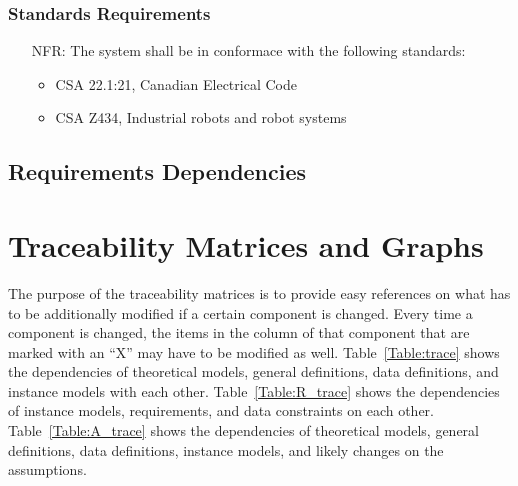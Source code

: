 \documentclass[12pt]{article}
\newcounter{nfrnum} %
\begin{document}
\subsubsection{Standards Requirements}
\noindent \begin{itemize}
\item[NFR\refstepcounter{nfrnum}\thenfrnum \label{NFR_Safety2}:] The system shall be in conformace with the following standards:
\begin{itemize}
\item CSA 22.1:21, Canadian Electrical Code \cite{CSA1}
\item CSA Z434, Industrial robots and robot systems \cite{CSA2}
\end{itemize}
\end{itemize}

\subsection{Requirements Dependencies}
\section{Traceability Matrices and Graphs}
\label{sec_tm}

The purpose of the traceability matrices is to provide easy references on what
has to be additionally modified if a certain component is changed.  Every time a
component is changed, the items in the column of that component that are marked
with an ``X'' may have to be modified as well.  Table~\ref{Table:trace} shows the
dependencies of theoretical models, general definitions, data definitions, and
instance models with each other. Table~\ref{Table:R_trace} shows the
dependencies of instance models, requirements, and data constraints on each
other. Table~\ref{Table:A_trace} shows the dependencies of theoretical models,
general definitions, data definitions, instance models, and likely changes on
the assumptions.



\end{document}
